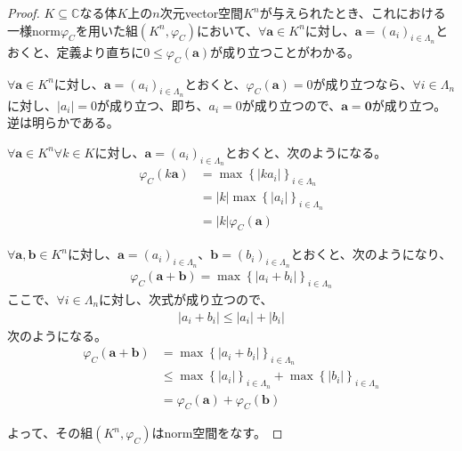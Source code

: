 \documentclass[dvipdfmx]{jsarticle}
\begin{document}
\begin{proof}
$K \subseteq \mathbb{C}$なる体$K$上の$n$次元vector空間$K^{n}$が与えられたとき、これにおける一様norm$\varphi_{C}$を用いた組$\left( K^{n},\varphi_{C} \right)$において、$\forall\mathbf{a} \in K^{n}$に対し、$\mathbf{a} = \left( a_{i} \right)_{i \in \varLambda_{n}}$とおくと、定義より直ちに$0 \leq \varphi_{C}\left( \mathbf{a} \right)$が成り立つことがわかる。\par
$\forall\mathbf{a} \in K^{n}$に対し、$\mathbf{a} = \left( a_{i} \right)_{i \in \varLambda_{n}}$とおくと、$\varphi_{C}\left( \mathbf{a} \right) = 0$が成り立つなら、$\forall i \in \varLambda_{n}$に対し、$\left| a_{i} \right| = 0$が成り立つ、即ち、$a_{i} = 0$が成り立つので、$\mathbf{a} = \mathbf{0}$が成り立つ。逆は明らかである。\par
$\forall\mathbf{a} \in K^{n}\forall k \in K$に対し、$\mathbf{a} = \left( a_{i} \right)_{i \in \varLambda_{n}}$とおくと、次のようになる。
\begin{align*}
\varphi_{C}\left( k\mathbf{a} \right) &= \max\left\{ \left| ka_{i} \right| \right\}_{i \in \varLambda_{n}}\\
&= |k|\max\left\{ \left| a_{i} \right| \right\}_{i \in \varLambda_{n}}\\
&= |k|\varphi_{C}\left( \mathbf{a} \right)
\end{align*}\par
$\forall\mathbf{a},\mathbf{b} \in K^{n}$に対し、$\mathbf{a} = \left( a_{i} \right)_{i \in \varLambda_{n}}$、$\mathbf{b} = \left( b_{i} \right)_{i \in \varLambda_{n}}$とおくと、次のようになり、
\begin{align*}
\varphi_{C}\left( \mathbf{a} + \mathbf{b} \right) = \max\left\{ \left| a_{i} + b_{i} \right| \right\}_{i \in \varLambda_{n}}
\end{align*}
ここで、$\forall i \in \varLambda_{n}$に対し、次式が成り立つので、
\begin{align*}
\left| a_{i} + b_{i} \right| \leq \left| a_{i} \right| + \left| b_{i} \right|
\end{align*}
次のようになる。
\begin{align*}
\varphi_{C}\left( \mathbf{a} + \mathbf{b} \right) &= \max\left\{ \left| a_{i} + b_{i} \right| \right\}_{i \in \varLambda_{n}}\\
&\leq \max\left\{ \left| a_{i} \right| \right\}_{i \in \varLambda_{n}} + \max\left\{ \left| b_{i} \right| \right\}_{i \in \varLambda_{n}}\\
&= \varphi_{C}\left( \mathbf{a} \right) + \varphi_{C}\left( \mathbf{b} \right)
\end{align*}\par
よって、その組$\left( K^{n},\varphi_{C} \right)$はnorm空間をなす。
\end{proof}
\end{document}
